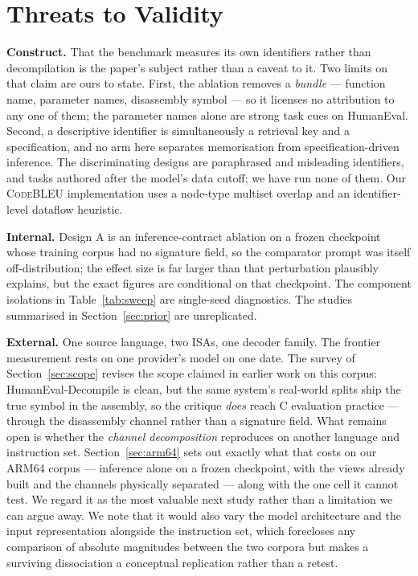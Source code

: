 \documentclass[conference]{IEEEtran}
\newcommand{\codebleu}{\textsc{CodeBLEU}\xspace}
\begin{document}
\section{Threats to Validity}
\textbf{Construct.} That the benchmark measures its own identifiers rather than
decompilation is the paper's subject rather than a caveat to it. Two limits on
that claim are ours to state. First, the ablation removes a \emph{bundle} ---
function name, parameter names, disassembly symbol --- so it licenses no
attribution to any one of them; the parameter names alone are strong task cues on
HumanEval. Second, a descriptive identifier is simultaneously a retrieval key and
a specification, and no arm here separates memorisation from specification-driven
inference. The discriminating designs are paraphrased and misleading identifiers,
and tasks authored after the model's data cutoff; we have run none of them. Our
\codebleu implementation uses a node-type multiset overlap and an
identifier-level dataflow heuristic.

\textbf{Internal.} Design A is an inference-contract ablation on a frozen
checkpoint whose training corpus had no signature field, so the comparator prompt
was itself off-distribution; the effect size is far larger than that perturbation
plausibly explains, but the exact figures are conditional on that checkpoint. The
component isolations in Table~\ref{tab:sweep} are single-seed diagnostics. The
studies summarised in Section~\ref{sec:prior} are unreplicated.

\textbf{External.} One source language, two ISAs, one decoder family. The
frontier measurement rests on one provider's model on one date. The survey of
Section~\ref{sec:scope} revises the scope claimed in earlier work on this corpus:
HumanEval-Decompile is clean, but the same system's real-world splits ship the
true symbol in the assembly, so the critique \emph{does} reach C evaluation
practice --- through the disassembly channel rather than a signature field.
What remains open is whether the \emph{channel decomposition} reproduces on
another language and instruction set.
Section~\ref{sec:arm64} sets out exactly what that costs on our ARM64 corpus ---
inference alone on a frozen checkpoint, with the views already built and the
channels physically separated --- along with the one cell it cannot test. We
regard it as the most valuable next study rather than a limitation we can argue
away. We note that it would also vary the model architecture and the input
representation alongside the instruction set, which forecloses any comparison of
absolute magnitudes between the two corpora but makes a surviving dissociation a
conceptual replication rather than a retest.
\end{document}
